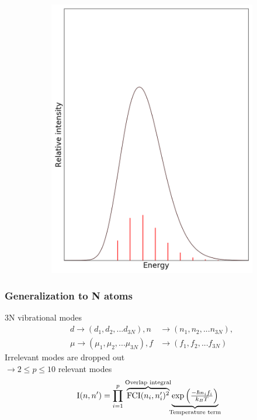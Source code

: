 \documentclass[12pt, fleqn]{beamer}
\begin{document}
\begin{frame}
\begin{overlayarea}{\textwidth}{14cm}
{\begin{figure}[h!]
\begin{subfigure}[b]{0.45\linewidth}
                    \includegraphics[width=\linewidth]{fc_sp/sp_8.png}
                \end{subfigure}
            \end{figure}
        }

    \end{overlayarea}
\end{frame}

\begin{frame}
    \frametitle{Generalization to N atoms}
    3N vibrational modes
    \pause
    \begin{align}
        d \to (d_1, d_2,... d_{3N}),  n &\to (n_1, n_2,... n_{3N}), \nonumber \\
        \mu \to (\mu_1, \mu_2,... \mu_{3N}), f &\to (f_1, f_2,... f_{3N}) \nonumber
    \end{align}
    \pause
    Irrelevant modes are dropped out \\
    $\to  2 \leq p \leq 10$ relevant modes
    \pause
    \begin{align}
        \mathrm{I}(n, n') &= \prod_{i=1}^{p} \;
        {\overbrace{\textstyle \mathrm{FCI}(n_i, n'_i)^2}^{\mathclap{\text{Overlap integral}}}} \;
        {\underbrace{\textstyle \exp\left( \frac{-\hbar n_i f_i}{k_B T} \right)}_{\mathclap{\text{Temperature term}}}} \nonumber 
    \end{align}
\end{frame}
\end{document}
